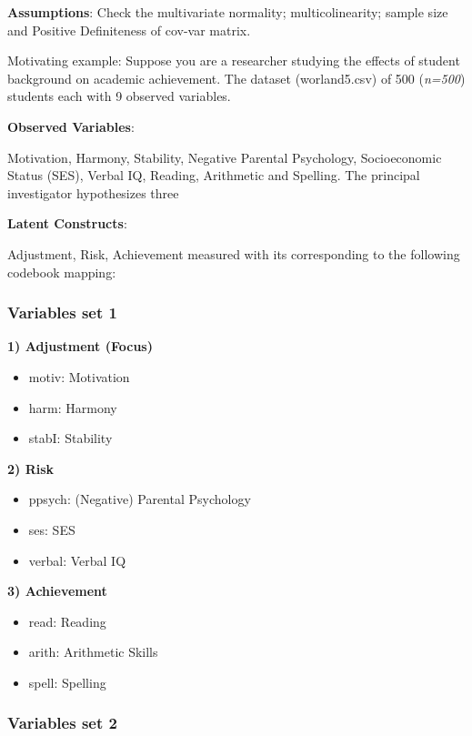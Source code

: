 \documentclass[
]{article}
\begin{document}
\textbf{Assumptions}: Check the multivariate normality;
multicolinearity; sample size and Positive Definiteness of cov-var
matrix.

Motivating example: Suppose you are a researcher studying the effects of
student background on {academic achievement}. The dataset (worland5.csv)
of 500 (\emph{n=500}) students each with 9 observed variables.

\textbf{Observed Variables}:

Motivation, Harmony, Stability, Negative Parental Psychology,
Socioeconomic Status (SES), Verbal IQ, Reading, Arithmetic and Spelling.
The principal investigator hypothesizes three

\textbf{Latent Constructs}:

Adjustment, Risk, Achievement measured with its corresponding to the
following codebook mapping:

\hypertarget{variables-set-1}{%
\subsubsection{Variables set 1}\label{variables-set-1}}

\textbf{1) Adjustment (Focus)}

\begin{itemize}
\item
  motiv: Motivation
\item
  harm: Harmony
\item
  stabI: Stability
\end{itemize}

\textbf{2) Risk}

\begin{itemize}
\item
  ppsych: (Negative) Parental Psychology
\item
  ses: SES
\item
  verbal: Verbal IQ
\end{itemize}

\textbf{3) Achievement}

\begin{itemize}
\item
  read: Reading
\item
  arith: Arithmetic Skills
\item
  spell: Spelling
\end{itemize}

\hypertarget{variables-set-2}{%
\subsubsection{Variables set 2}\label{variables-set-2}}
\end{document}

